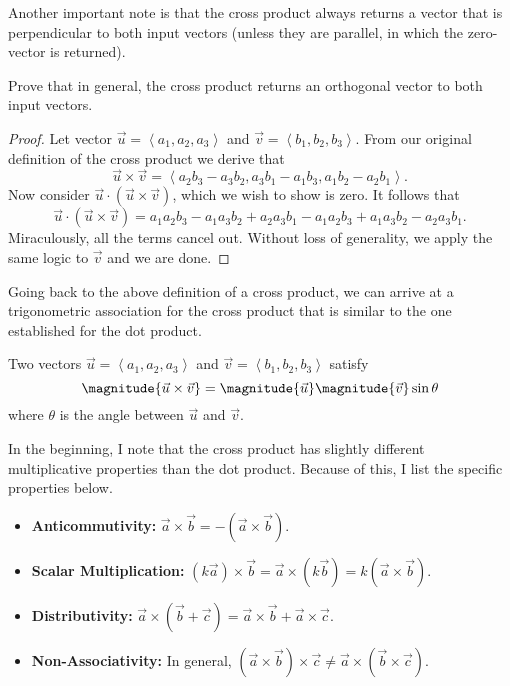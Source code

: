 \begin{remark}
    Another important note is that the cross product always returns a vector that is perpendicular to both input vectors (unless they are parallel, in which the zero-vector is returned).
\end{remark}

\begin{example}
    Prove that in general, the cross product returns an orthogonal vector to both input vectors.

    \begin{proof}
        Let vector $\vec{u} = \left<a_{1}, a_{2}, a_{3}\right>$ and $\vec{v} = \left<b_{1}, b_{2}, b_{3}\right>$. From our original definition of the cross product we derive that
        \[\vec{u} \times \vec{v} = \left<a_{2}b_{3} - a_{3}b_{2}, a_{3}b_{1} - a_{1}b_{3}, a_{1}b_{2} - a_{2}b_{1}\right>.\]
        Now consider $\vec{u} \cdot (\vec{u} \times \vec{v})$, which we wish to show is zero. It follows that
        \[\vec{u} \cdot (\vec{u} \times \vec{v}) = a_{1}a_{2}b_{3} - a_{1}a_{3}b_{2} + a_{2}a_{3}b_{1} - a_{1}a_{2}b_{3} + a_{1}a_{3}b_{2} - a_{2}a_{3}b_{1}.\]
        Miraculously, all the terms cancel out. Without loss of generality, we apply the same logic to $\vec{v}$ and we are done.
    \end{proof}
\end{example}

Going back to the above definition of a cross product, we can arrive at a trigonometric association for the cross product that is similar to the one established for the dot product.

\begin{proposition}
    Two vectors $\vec{u} = \left<a_{1}, a_{2}, a_{3}\right>$ and $\vec{v} = \left<b_{1}, b_{2}, b_{3}\right>$ satisfy
    \[\magnitude{\vec{u} \times \vec{v}} = \magnitude{\vec{u}} \magnitude{\vec{v}} \sin\theta\]
    where $\theta$ is the angle between $\vec{u}$ and $\vec{v}$.
\end{proposition}

In the beginning, I note that the cross product has slightly different multiplicative properties than the dot product. Because of this, I list the specific properties below.

\begin{itemize}
    \item \textbf{Anticommutivity:} $\vec{a} \times \vec{b} = -(\vec{a} \times \vec{b})$.
    \item \textbf{Scalar Multiplication:} $(k\vec{a}) \times \vec{b} = \vec{a} \times (k\vec{b}) = k(\vec{a} \times \vec{b})$.
    \item \textbf{Distributivity:} $\vec{a} \times (\vec{b} + \vec{c}) = \vec{a} \times \vec{b} + \vec{a} \times \vec{c}$.
    \item \textbf{Non-Associativity:} In general, $(\vec{a} \times \vec{b}) \times \vec{c} \neq \vec{a} \times (\vec{b} \times \vec{c})$.
\end{itemize}

